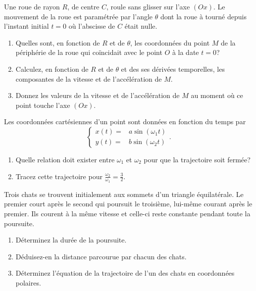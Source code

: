 \begin{exercice}%
  Une roue de rayon \(R\), de centre \(C\), roule sans glisser sur l'axe 
  \((Ox)\). Le mouvement de la roue est paramétrée par l'angle \(\theta\) dont 
  la roue à tourné depuis l'instant initial \(t=0\) où l'abscisse de \(C\) 
  était nulle.
  \begin{enumerate}%
  \item Quelles sont, en fonction de \(R\) et de \(\theta\), les coordonnées 
  du point \(M\) de la périphérie de la roue qui coïncidait avec le point 
  \(O\) à la date \(t=0\)?
  \item Calculez, en fonction de \(R\) et de \(\theta\) et des ses dérivées 
    temporelles, les composantes de la vitesse et de l'accélération de \(M\).
  \item Donnez les valeurs de la vitesse et de l'accélération de \(M\) au 
    moment où ce point touche l'axe \((Ox)\).
  \end{enumerate}%
\end{exercice}%
%
\begin{exercice}%
  Les coordonnées cartésiennes d'un point sont données en fonction du temps par
  \begin{equation}%
    \begin{cases}%
      x(t)=&a\sin(\omega_1 t)\\
      y(t)=&b\sin(\omega_2 t)
    \end{cases}.%
  \end{equation}%
  \begin{enumerate}%
  \item Quelle relation doit exister entre \(\omega_1\) et \(\omega_2\) pour 
    que la trajectoire soit fermée?
  \item Tracez cette trajectoire pour 
  \(\frac{\omega_2}{\omega_1}=\frac{3}{2}\).
  \end{enumerate}%
\end{exercice}%
%
\begin{exercice}%
  Trois chats se trouvent initialement aux sommets d'un triangle équilatérale. 
  Le premier court après le second qui poursuit le troisième, lui-même courant 
  après le premier. Ils courent à la même vitesse et celle-ci reste constante 
  pendant toute la poursuite.
  \begin{enumerate}%
  \item Déterminez la durée de la poursuite.
  \item Déduisez-en la distance parcourue par chacun des chats.
  \item Déterminez l'équation de la trajectoire de l'un des chats en 
    coordonnées polaires.
  \end{enumerate}%
\end{exercice}%
